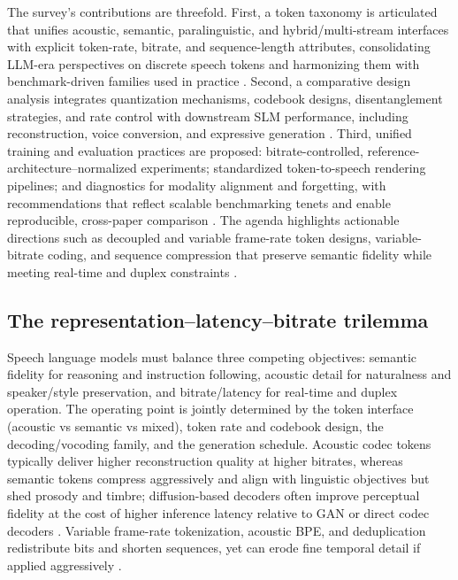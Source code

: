 The survey’s contributions are threefold. First, a token taxonomy is articulated that unifies acoustic, semantic, paralinguistic, and hybrid/multi-stream interfaces with explicit token-rate, bitrate, and sequence-length attributes, consolidating LLM-era perspectives on discrete speech tokens \cite{guo2025recentadvancesdiscretespeechtokensreview} and harmonizing them with benchmark-driven families used in practice \cite{mousavi2024dasbdiscreteaudiospeechbenchmark}. Second, a comparative design analysis integrates quantization mechanisms, codebook designs, disentanglement strategies, and rate control with downstream SLM performance, including reconstruction, voice conversion, and expressive generation \cite{guo2025recentadvancesdiscretespeechtokensreview}. Third, unified training and evaluation practices are proposed: bitrate-controlled, reference-architecture–normalized experiments; standardized token-to-speech rendering pipelines; and diagnostics for modality alignment and forgetting, with recommendations that reflect scalable benchmarking tenets and enable reproducible, cross-paper comparison . The agenda highlights actionable directions such as decoupled and variable frame-rate token designs, variable-bitrate coding, and sequence compression that preserve semantic fidelity while meeting real-time and duplex constraints \cite{guo2025recentadvancesdiscretespeechtokensreview}.



\subsection{The representation–latency–bitrate trilemma} \label{subsec:The representation–latency–bitrate trilemma}

Speech language models must balance three competing objectives: semantic fidelity for reasoning and instruction following, acoustic detail for naturalness and speaker/style preservation, and bitrate/latency for real-time and duplex operation. The operating point is jointly determined by the token interface (acoustic vs semantic vs mixed), token rate and codebook design, the decoding/vocoding family, and the generation schedule. Acoustic codec tokens typically deliver higher reconstruction quality at higher bitrates, whereas semantic tokens compress aggressively and align with linguistic objectives but shed prosody and timbre; diffusion-based decoders often improve perceptual fidelity at the cost of higher inference latency relative to GAN or direct codec decoders \cite{guo2025recentadvancesdiscretespeechtokensreview}. Variable frame-rate tokenization, acoustic BPE, and deduplication redistribute bits and shorten sequences, yet can erode fine temporal detail if applied aggressively \cite{guo2025recentadvancesdiscretespeechtokensreview}.



